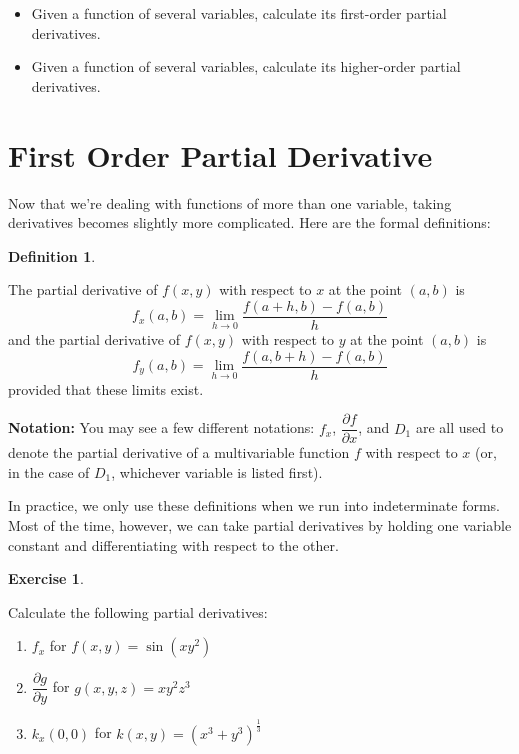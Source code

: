 \documentclass[
]{book}
\providecommand{\tightlist}{%
  \setlength{\itemsep}{0pt}\setlength{\parskip}{0pt}}
\theoremstyle{definition}
\newtheorem{definition}{Definition}[chapter]
\theoremstyle{definition}
\theoremstyle{definition}
\newtheorem{exercise}{Exercise}[chapter]
\theoremstyle{definition}
\theoremstyle{remark}
\begin{document}
\begin{itemize}
\tightlist
\item
  Given a function of several variables, calculate its first-order partial derivatives.
\item
  Given a function of several variables, calculate its higher-order partial derivatives.
\end{itemize}

\hypertarget{first-order-partial-derivative}{%
\section{First Order Partial Derivative}\label{first-order-partial-derivative}}

Now that we're dealing with functions of more than one variable, taking derivatives becomes slightly more complicated. Here are the formal definitions:

\begin{definition}
\protect\hypertarget{def:unlabeled-div-14}{}\label{def:unlabeled-div-14}

The partial derivative of \(f(x,y)\) with respect to \(x\) at the point \((a,b)\) is \[f_x(a,b)=\displaystyle \lim_{h\to 0}\dfrac{f(a+h,b)-f(a,b)}{h}\] and the partial derivative of \(f(x,y)\) with respect to \(y\) at the point \((a,b)\) is \[f_y(a,b)=\displaystyle \lim_{h\to 0}\dfrac{f(a,b+h)-f(a,b)}{h}\] provided that these limits exist.

\end{definition}

\textbf{Notation:} You may see a few different notations: \(f_x\), \(\dfrac{\partial f}{\partial x}\), and \(D_1\) are all used to denote the partial derivative of a multivariable function \(f\) with respect to \(x\) (or, in the case of \(D_1\), whichever variable is listed first).

In practice, we only use these definitions when we run into indeterminate forms. Most of the time, however, we can take partial derivatives by holding one variable constant and differentiating with respect to the other.

\begin{exercise}
\protect\hypertarget{exr:unlabeled-div-15}{}\label{exr:unlabeled-div-15}

Calculate the following partial derivatives:

\begin{enumerate}
\def\labelenumi{\alph{enumi}.}
\tightlist
\item
  \(f_x\) for \(f(x,y)=\sin(xy^2)\)
\item
  \(\dfrac{\partial g}{\partial y}\) for \(g(x,y,z)=xy^2z^3\)
\item
  \(k_x(0,0)\) for \(k(x,y)=(x^3+y^3)^{\frac{1}{3}}\)
\end{enumerate}

\end{exercise}
\end{document}

